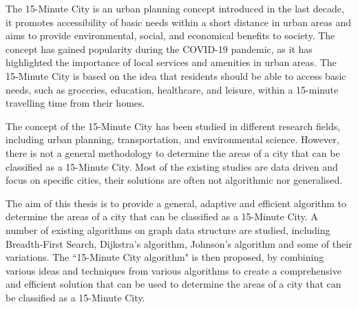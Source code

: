 \begin{Abstract}
\begin{changemargin}{1cm}{1cm}

The 15-Minute City is an urban planning concept introduced in the last decade, it promotes accessibility of basic needs within a short distance in urban areas and aims to provide environmental, social, and economical benefits to society. The concept has gained popularity during the COVID-19 pandemic, as it has highlighted the importance of local services and amenities in urban areas. The 15-Minute City is based on the idea that residents should be able to access basic needs, such as groceries, education, healthcare, and leisure, within a 15-minute travelling time from their homes.

\vspace{0.5cm}

The concept of the 15-Minute City has been studied in different research fields, including urban planning, transportation, and environmental science. However, there is not a general methodology to determine the areas of a city that can be classified as a 15-Minute City. Most of the existing studies are data driven and focus on specific cities, their solutions are often not algorithmic nor generalised.

\vspace{0.5cm}

The aim of this thesis is to provide a general, adaptive and efficient algorithm to determine the areas of a city that can be classified as a 15-Minute City. A number of existing algorithms on graph data structure are studied, including Breadth-First Search, Dijkstra's algorithm, Johnson's algorithm and some of their variations. The ``15-Minute City algorithm" is then proposed, by combining various ideas and techniques from various algorithms to create a comprehensive and efficient solution that can be used to determine the areas of a city that can be classified as a 15-Minute City.

\end{changemargin}
\end{Abstract}